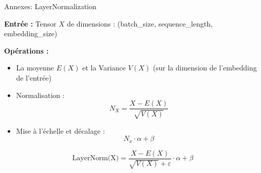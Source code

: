 \documentclass[12pt]{beamer}
\begin{document}

\begin{frame}{Annexes: LayerNormalization}

\footnotesize
\textbf{Entrée : } Tensor $X$ de dimensions : (batch\_size, sequence\_length, embedding\_size)

\textbf{Opérations : }

\begin{itemize}
	\item La moyenne $E(X)$ et la Variance $V(X)$ (sur la dimension de l'embedding de l'entrée)
	\item Normalisation : $$N_X = \frac{X - E(X)}{\sqrt{V(X)}}$$
	\item Mise à l'échelle et décalage : $$N_x \cdot \alpha + \beta$$
\end{itemize}

$$\text{LayerNorm(X)} = \frac{X - E(X)}{\sqrt{V(X)}+\varepsilon} \cdot \alpha + \beta$$

\normalsize

\end{frame}


\end{document}
